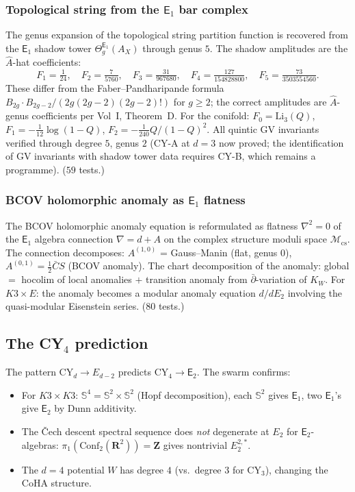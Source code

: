\documentclass[11pt]{article}
\newcommand{\bS}{\mathbb{S}}
\newcommand{\Eone}{\mathsf{E}_1}
\newcommand{\Etwo}{\mathsf{E}_2}
\begin{document}
\subsubsection{Topological string from the $\Eone$ bar complex}

The genus expansion of the topological string partition function is recovered from the $\Eone$ shadow tower $\Theta_g^{\Eone}(A_X)$ through genus $5$. The shadow amplitudes are the $\hat{A}$-hat coefficients:
\[
 F_1 = \tfrac{1}{24}, \quad F_2 = \tfrac{7}{5760}, \quad F_3 = \tfrac{31}{967680}, \quad F_4 = \tfrac{127}{154828800}, \quad F_5 = \tfrac{73}{3503554560}.
\]
These differ from the Faber--Pandharipande formula $B_{2g} \cdot B_{2g-2} / (2g(2g-2)(2g-2)!)$ for $g \geq 2$; the correct amplitudes are $\hat{A}$-genus coefficients per Vol~I, Theorem~D. For the conifold: $F_0 = \mathrm{Li}_3(Q)$, $F_1 = -\tfrac{1}{12}\log(1-Q)$, $F_2 = -\tfrac{1}{240} Q/(1-Q)^2$. All quintic GV invariants verified through degree $5$, genus $2$ (CY-A at $d = 3$ now proved; the identification of GV invariants with shadow tower data requires CY-B, which remains a programme). ($59$ tests.)

\subsubsection{BCOV holomorphic anomaly as $\Eone$ flatness}

The BCOV holomorphic anomaly equation is reformulated as flatness $\nabla^2 = 0$ of the $\Eone$ algebra connection $\nabla = d + A$ on the complex structure moduli space $\mathcal{M}_{\mathrm{cs}}$. The connection decomposes: $A^{(1,0)}$ = Gauss--Manin (flat, genus $0$), $A^{(0,1)} = \tfrac{1}{2}\bar{C}S$ (BCOV anomaly). The chart decomposition of the anomaly: global $=$ hocolim of local anomalies $+$ transition anomaly from $\bar{\partial}$-variation of $K_W$. For $K3 \times E$: the anomaly becomes a modular anomaly equation $d/dE_2$ involving the quasi-modular Eisenstein series. ($80$ tests.)

\subsection{The CY$_4$ prediction}

The pattern $\mathrm{CY}_d \to E_{d-2}$ predicts CY$_4 \to \Etwo$. The swarm confirms:
\begin{itemize}
 \item For $K3 \times K3$: $\bS^4 = \bS^2 \times \bS^2$ (Hopf decomposition), each $\bS^2$ gives $\Eone$, two $\Eone$'s give $\Etwo$ by Dunn additivity.
 \item The \v{C}ech descent spectral sequence does \emph{not} degenerate at $E_2$ for $\Etwo$-algebras: $\pi_1(\mathrm{Conf}_2(\mathbf{R}^2)) = \mathbf{Z}$ gives nontrivial $E_2^{2,*}$.
 \item The $d = 4$ potential $W$ has degree $4$ (vs.\ degree $3$ for CY$_3$), changing the CoHA structure.
\end{itemize}
\end{document}
